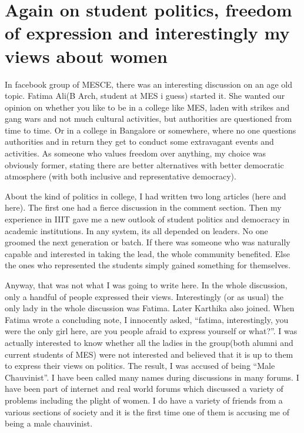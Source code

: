 \section*{Again on student politics, freedom of expression and interestingly my views about women}
\vskip 2pt

In facebook group of MESCE, there was an interesting discussion on an age old topic. Fatima Ali(B Arch, student at MES i guess) started it. She wanted our opinion on whether you like to be in a college like MES, laden with strikes and gang wars and not much cultural activities, but authorities are questioned from time to time. Or in a college in Bangalore or somewhere, where no one questions authorities and in return they get to conduct some extravagant events and activities. As someone who values freedom over anything, my choice was obviously former, stating there are better alternatives with better democratic atmosphere (with both inclusive and representative democracy).

About the kind of politics in college, I had written two long articles (here and here). The first one had a fierce discussion in the comment section. Then my experience in IIIT gave me a new outlook of student politics and democracy in academic institutions. In any system, its all depended on leaders. No one groomed the next generation or batch. If there was someone who was naturally capable and interested in taking the lead, the whole community benefited. Else the ones who represented the students simply gained something for themselves.

Anyway, that was not what I was going to write here. In the whole discussion, only a handful of people expressed their views. Interestingly (or as usual) the only lady in the whole discussion was Fatima. Later Karthika also joined. When Fatima wrote a concluding note, I innocently asked, “fatima, interestingly, you were the only girl here, are you people afraid to express yourself or what?”. I was actually interested to know whether all the ladies in the group(both alumni and current students of MES) were not interested and believed that it is up to them to express their views on politics. The result, I was accused of being “Male Chauvinist”. I have been called many names during discussions in many forums. I have been part of internet and real world forums which discussed a variety of problems including the plight of women. I do have a variety of friends from a various sections of society and it is the first time one of them is accusing me of being a male chauvinist.

